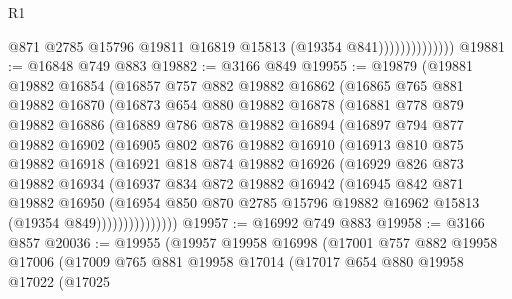 \begin{lexlean}{R1}
\begin{coremodule}
                              @871
                              @2785
                              @15796
                              @19811
                              @16819
                              @15813
                              (@19354 @841))))))))))))))
@19881 := @16848 @749 @883
@19882 := @3166 @849
@19955 := @19879
    (@19881
      @19882
      @16854
      (@16857
        @757
        @882
        @19882
        @16862
        (@16865
          @765
          @881
          @19882
          @16870
          (@16873
            @654
            @880
            @19882
            @16878
            (@16881
              @778
              @879
              @19882
              @16886
              (@16889
                @786
                @878
                @19882
                @16894
                (@16897
                  @794
                  @877
                  @19882
                  @16902
                  (@16905
                    @802
                    @876
                    @19882
                    @16910
                    (@16913
                      @810
                      @875
                      @19882
                      @16918
                      (@16921
                        @818
                        @874
                        @19882
                        @16926
                        (@16929
                          @826
                          @873
                          @19882
                          @16934
                          (@16937
                            @834
                            @872
                            @19882
                            @16942
                            (@16945
                              @842
                              @871
                              @19882
                              @16950
                              (@16954
                                @850
                                @870
                                @2785
                                @15796
                                @19882
                                @16962
                                @15813
                                (@19354 @849)))))))))))))))
@19957 := @16992 @749 @883
@19958 := @3166 @857
@20036 := @19955
    (@19957
      @19958
      @16998
      (@17001
        @757
        @882
        @19958
        @17006
        (@17009
          @765
          @881
          @19958
          @17014
          (@17017
            @654
            @880
            @19958
            @17022
            (@17025

\end{coremodule}
\end{lexlean}
